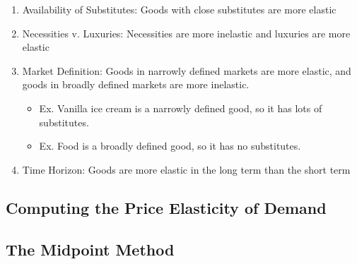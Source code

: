 \begin{enumerate}

	\item Availability of Substitutes: Goods with close substitutes are more elastic
		
	\item Necessities v. Luxuries: Necessities are more inelastic and luxuries are more elastic
	
	\item Market Definition: Goods in narrowly defined markets are more elastic, and goods in broadly defined markets are more inelastic.
	
		\begin{itemize}
		
		\item Ex. Vanilla ice cream is a narrowly defined good, so it has lots of substitutes.
		
		\item Ex. Food is a broadly defined good, so it has no substitutes.
		
		\end{itemize}
		
	\item Time Horizon: Goods are more elastic in the long term than the short term
	
%		
%		
%		

\end{enumerate}



\subsection{Computing the Price Elasticity of Demand}



\subsection{The Midpoint Method}